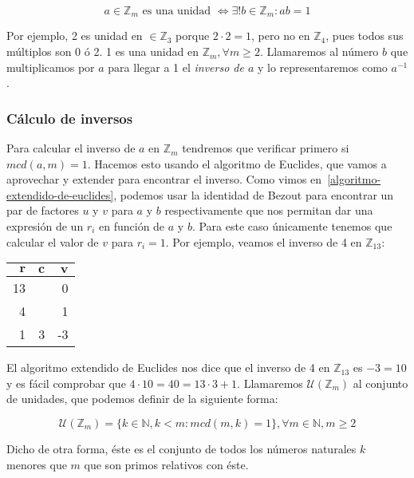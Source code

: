 \[a \in\mathbb{Z}_m \text{ es una unidad } \iff \exists! b \in\mathbb{Z}_m : ab = 1\]

Por ejemplo, 2 es unidad en $\in\mathbb{Z}_3$ porque $2 \cdot 2 = 1$, pero no en $\mathbb{Z}_4$, pues todos sus múltiplos son 0 ó 2.
1 es una unidad en $\mathbb{Z}_m, \forall m \geq 2$.
Llamaremos al número $b$ que multiplicamos por $a$ para llegar a 1 el \textit{inverso de $a$} y lo representaremos como $a^{-1}$.

\subsubsection{Cálculo de inversos}

Para calcular el inverso de $a$ en $\mathbb{Z}_m$ tendremos que verificar primero si $mcd(a,m)=1$.
Hacemos esto usando el algoritmo de Euclides, que vamos a aprovechar y extender para encontrar el inverso.
Como vimos en~\ref{algoritmo-extendido-de-euclides}, podemos usar la identidad de Bezout para encontrar un par de factores $u$ y $v$ para $a$ y $b$ respectivamente que nos permitan dar una expresión de un $r_i$ en función de $a$ y $b$.
Para este caso únicamente tenemos que calcular el valor de $v$ para $r_i = 1$.
Por ejemplo, veamos el inverso de 4 en $\mathbb{Z}_{13}$:

\begin{center}
\begin{tabular}{r r r}
	$\boldsymbol{r}$ & $\boldsymbol{c}$ & $\boldsymbol{v}$ \\
	\toprule
	13               &                  & 0                \\
	4                &                  & 1                \\
	1                & 3                & -3               \\
\end{tabular}
\end{center}

El algoritmo extendido de Euclides nos dice que el inverso de 4 en $\mathbb{Z}_{13}$ es $-3 = 10$ y es fácil comprobar que $4 \cdot 10 = 40 = 13 \cdot 3 + 1$.
Llamaremos $\mathcal{U}(\mathbb{Z}_m)$ al conjunto de unidades, que podemos definir de la siguiente forma:

\[\mathcal{U}(\mathbb{Z}_m) = \{k \in\mathbb{N}, k < m: mcd(m,k) = 1\}, \forall m \in\mathbb{N}, m \geq 2\]

Dicho de otra forma, éste es el conjunto de todos los números naturales $k$ menores que $m$ que son primos relativos con éste.

